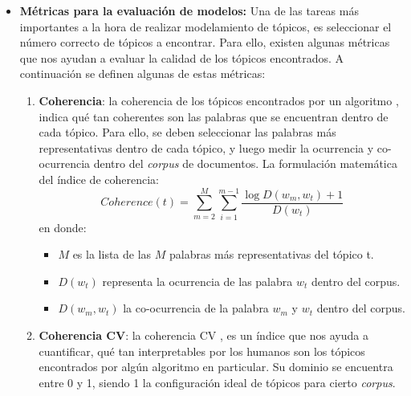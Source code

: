 \begin{itemize}
\item \textbf{Métricas para la evaluación de modelos:} 
    Una de las tareas más importantes a la hora de realizar modelamiento de tópicos, es seleccionar el número correcto de tópicos a encontrar. Para ello, existen algunas métricas que nos ayudan a evaluar la calidad de los tópicos encontrados. A continuación se definen algunas de estas métricas:
    \begin{enumerate}
        \item \textbf{Coherencia}: la coherencia de los tópicos encontrados por un algoritmo \cite{mimno2011optimizing}, indica qué tan coherentes son las palabras que se encuentran dentro de cada tópico. Para ello, se deben seleccionar las palabras más representativas dentro de cada tópico, y luego medir la ocurrencia y co-ocurrencia dentro del \textit{corpus} de documentos. La formulación matemática del índice de coherencia:
        \begin{equation*}
            Coherence(t) = \sum_{m=2}^M\sum_{i=1}^{m-1}\frac{\log{ D(w_m,w_t)+1}}{D(w_t)}
        \end{equation*}
        en donde:
        \begin{itemize}
            \item $M$ es la lista de las $M$ palabras más representativas del tópico t.
            \item $D(w_t)$ representa la ocurrencia de las palabra $w_t$ dentro del corpus.
            \item $D(w_m,w_t)$ la co-ocurrencia de la palabra $w_m$ y $w_t$ dentro del corpus.
        \end{itemize}
        \item \textbf{Coherencia CV}: la coherencia CV \cite{roder2015exploring}, es un índice que nos ayuda a cuantificar, qué tan interpretables por los humanos son los tópicos encontrados por algún algoritmo en particular. Su dominio se encuentra entre 0 y 1, siendo 1 la configuración ideal de tópicos para cierto \textit{corpus}.
    \end{enumerate}
\end{itemize}
     
